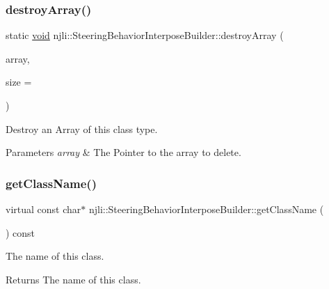 \subsubsection{\texorpdfstring{destroy\+Array()}{destroyArray()}}
{\footnotesize\ttfamily static \mbox{\hyperlink{_thread_8h_af1e856da2e658414cb2456cb6f7ebc66}{void}} njli\+::\+Steering\+Behavior\+Interpose\+Builder\+::destroy\+Array (\begin{DoxyParamCaption}\item[{\mbox{\hyperlink{classnjli_1_1_steering_behavior_interpose_builder}{Steering\+Behavior\+Interpose\+Builder}} $\ast$$\ast$}]{array,  }\item[{const \mbox{\hyperlink{_util_8h_a10e94b422ef0c20dcdec20d31a1f5049}{u32}}}]{size = {} }\end{DoxyParamCaption})\hspace{0.3cm}{\ttfamily [static]}}

Destroy an Array of this class type.


\begin{DoxyParams}{Parameters}
{\em array} & The Pointer to the array to delete. \\
\hline
\end{DoxyParams}
\mbox{\label{classnjli_1_1_steering_behavior_interpose_builder_a4d5aca1336d985272b14bf3d79526fa8}} 
\subsubsection{\texorpdfstring{get\+Class\+Name()}{getClassName()}}
{\footnotesize\ttfamily virtual const char$\ast$ njli\+::\+Steering\+Behavior\+Interpose\+Builder\+::get\+Class\+Name (\begin{DoxyParamCaption}{ }\end{DoxyParamCaption}) const\hspace{0.3cm}{\ttfamily [virtual]}}

The name of this class.

\begin{DoxyReturn}{Returns}
The name of this class. 
\end{DoxyReturn}


